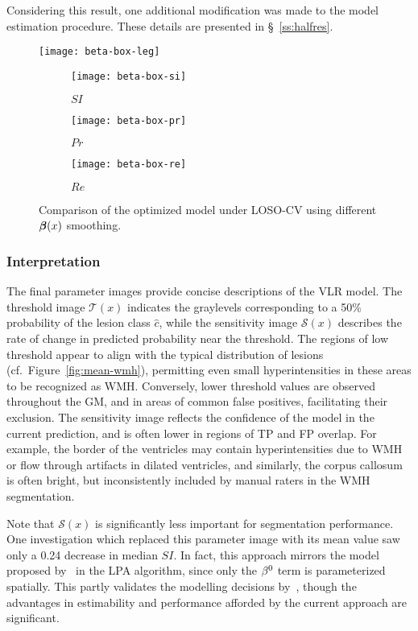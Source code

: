 \par
Considering this result, one additional modification was made
to the model estimation procedure.
These details are presented in \S~\ref{ss:halfres}.
\begin{figure}
  \centering
  \texttt{[image: beta-box-leg]}\\[0.5em]
  \begin{subfigure}{0.32\textwidth}
    \centering\texttt{[image: beta-box-si]}
    \caption{$SI$}%
    \label{fig:seg-box-beta-si}
  \end{subfigure}
  \begin{subfigure}{0.32\textwidth}
    \centering\texttt{[image: beta-box-pr]}
    \caption{$Pr$}%
    \label{fig:seg-box-beta-pr}
  \end{subfigure}
  \begin{subfigure}{0.32\textwidth}
    \centering\texttt{[image: beta-box-re]}
    \caption{$Re$}%
    \label{fig:seg-box-beta-re}
  \end{subfigure}
  \caption{Comparison of the optimized model under LOSO-CV
    using different $\bm{\beta}(x)$ smoothing.}%
  \label{fig:seg-box-beta}
\end{figure}
\subsubsection{Interpretation}\label{sss:exp-beta-interp}
The final parameter images provide concise descriptions of the VLR model.
The threshold image $\mathcal{T}(x)$ indicates the graylevels
corresponding to a 50\% probability of the lesion class $\hat{c}$,
while the sensitivity image $\mathcal{S}(x)$ describes
the rate of change in predicted probability near the threshold.
The regions of low threshold appear to align with
the typical distribution of lesions (cf.\ Figure~\ref{fig:mean-wmh}),
permitting even small hyperintensities in these areas to be recognized as WMH.
Conversely, lower threshold values are observed throughout the GM,
and in areas of common false positives, facilitating their exclusion.
The sensitivity image reflects the confidence of the model in the current prediction,
and is often lower in regions of TP and FP overlap.
For example, the border of the ventricles may contain hyperintensities
due to WMH or flow through artifacts in dilated ventricles,
and similarly, the corpus callosum is often bright,
but inconsistently included by manual raters in the WMH segmentation.
\par
Note that $\mathcal{S}(x)$ is significantly less important for segmentation performance.
One investigation which replaced this parameter image with its mean value
saw only a 0.24 decrease in median $SI$.
In fact, this approach mirrors the model proposed by~\citeauthor{Schmidt2017} in the LPA algorithm,
since only the $\beta^0$ term is parameterized spatially.
This partly validates the modelling decisions by~\citeauthor{Schmidt2017},
though the advantages in estimability and performance
afforded by the current approach are significant.
